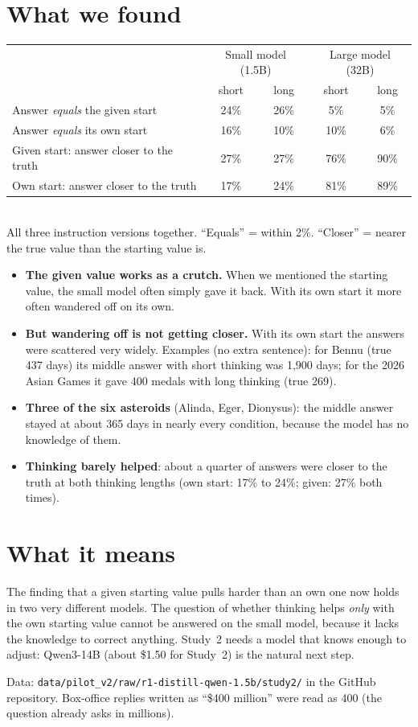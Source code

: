 \documentclass[11pt,a4paper]{article}
\begin{document}
\section*{What we found}
\begin{center}\small
\begin{tabular}{@{}lcccc@{}}
\toprule
 & \multicolumn{2}{c}{Small model (1.5B)} & \multicolumn{2}{c}{Large model (32B)} \\
 & short & long & short & long \\
\midrule
Answer \emph{equals} the given start & 24\% & 26\% & 5\% & 5\% \\
Answer \emph{equals} its own start & 16\% & 10\% & 10\% & 6\% \\
Given start: answer closer to the truth & 27\% & 27\% & 76\% & 90\% \\
Own start: answer closer to the truth & 17\% & 24\% & 81\% & 89\% \\
\bottomrule
\end{tabular}\\[2pt]
{\footnotesize All three instruction versions together. \enquote{Equals} = within 2\%. \enquote{Closer} = nearer the true value than the starting value is.}
\end{center}
\begin{itemize}[leftmargin=*]
  \item \textbf{The given value works as a crutch.} When we mentioned the starting value, the small model often simply gave it back. With its own start it more often wandered off on its own.
  \item \textbf{But wandering off is not getting closer.} With its own start the answers were scattered very widely. Examples (no extra sentence): for Bennu (true 437 days) its middle answer with short thinking was 1,900 days; for the 2026 Asian Games it gave 400 medals with long thinking (true 269).
  \item \textbf{Three of the six asteroids} (Alinda, Eger, Dionysus): the middle answer stayed at about 365 days in nearly every condition, because the model has no knowledge of them.
  \item \textbf{Thinking barely helped}: about a quarter of answers were closer to the truth at both thinking lengths (own start: 17\% to 24\%; given: 27\% both times).
\end{itemize}

\section*{What it means}
The finding that a given starting value pulls harder than an own one now holds in two very different models. The question of whether thinking helps \emph{only} with the own starting value cannot be answered on the small model, because it lacks the knowledge to correct anything. Study~2 needs a model that knows enough to adjust: Qwen3-14B (about \$1.50 for Study~2) is the natural next step.

\vfill
{\small Data: \texttt{data/pilot\_v2/raw/r1-distill-qwen-1.5b/study2/} in the GitHub repository. Box-office replies written as \enquote{\$400 million} were read as 400 (the question already asks in millions).}
\end{document}
